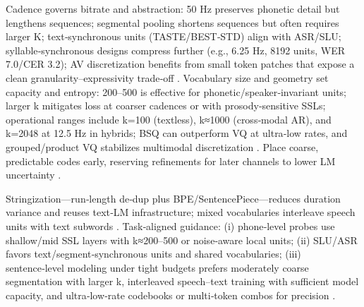 Cadence governs bitrate and abstraction: 50 Hz preserves phonetic detail but lengthens sequences; segmental pooling shortens sequences but often requires larger K; text‑synchronous units (TASTE/BEST‑STD) align with ASR/SLU; syllable‑synchronous designs compress further (e.g., 6.25 Hz, 8192 units, WER 7.0/CER 3.2); AV discretization benefits from small token patches that expose a clean granularity–expressivity trade‑off \cite{kando2025exploringeffectsegmentationvocabularysiz,tseng2025tastetextalignedspeechtokenizationembedd,baade2024syllablelmlearningcoarsesemanticunitsspe,sadok2025vectorquantizedmaskedautoencoderaudiovis}. Vocabulary size and geometry set capacity and entropy: 200–500 is effective for phonetic/speaker‑invariant units; larger k mitigates loss at coarser cadences or with prosody‑sensitive SSLs; operational ranges include k=100 (textless), k≈1000 (cross‑modal AR), and k=2048 at 12.5 Hz in hybrids; BSQ can outperform VQ at ultra‑low rates, and grouped/product VQ stabilizes multimodal discretization \cite{chang2024dcspinspeakerinvariantspeechtokenizerspo,onda2025benchmarkingprosodyencodingdiscretespeec,hsu2024exploringcontextlearningtextlessspeechla,wu2024speechcomposerunifyingmultiplespeechtask,yang2025diffsoundstreamefficientspeechtokenizati,wang2025tadicodectextawarediffusionspeechtokeniz,sadok2025vectorquantizedmaskedautoencoderaudiovis}. Place coarse, predictable codes early, reserving refinements for later channels to lower LM uncertainty \cite{guo2025recentadvancesdiscretespeechtokensreview}.

Stringization—run‑length de‑dup plus BPE/SentencePiece—reduces duration variance and reuses text‑LM infrastructure; mixed vocabularies interleave speech units with text subwords \cite{guo2025recentadvancesdiscretespeechtokensreview,wu2024speechcomposerunifyingmultiplespeechtask,hsu2024exploringcontextlearningtextlessspeechla}. Task‑aligned guidance: (i) phone‑level probes use shallow/mid SSL layers with k≈200–500 or noise‑aware local units; (ii) SLU/ASR favors text/segment‑synchronous units and shared vocabularies; (iii) sentence‑level modeling under tight budgets prefers moderately coarse segmentation with larger k, interleaved speech–text training with sufficient model capacity, and ultra‑low‑rate codebooks or multi‑token combos for precision \cite{visser2025spokenlanguagemodelingdurationpenalizeds,gong2025xytokenizermitigatingsemanticacousticcon,kando2025exploringeffectsegmentationvocabularysiz,maimon2025scalinganalysisinterleavedspeechtextlang,zhang2025impactframeratesspeechtokenizercasestudy}.

